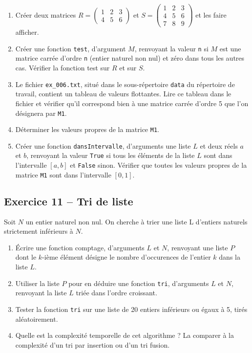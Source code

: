 \documentclass[10pt,fleqn]{article} %
\begin{document}
\begin{multicols}{2}
\begin{enumerate}
\item Créer deux matrices $R=\begin{pmatrix} 1 & 2 & 3 \\ 4 & 5 & 6  \end{pmatrix}$ et 
$S =\begin{pmatrix} 1 & 2 & 3 \\ 4 & 5 & 6\\ 7 & 8 & 9  \end{pmatrix}$ et les faire afficher.
\item Créer une fonction \texttt{test}, d’argument $M$, renvoyant la valeur \texttt{n} si $M$ est une matrice carrée d’ordre \texttt{n} (entier naturel non nul) et zéro dans tous les autres cas.
Vérifier la fonction test sur $R$ et sur $S$.
\item Le fichier \texttt{ex\_006.txt}, situé dans le sous-répertoire \texttt{data} du répertoire de travail, contient un tableau de valeurs flottantes. Lire ce tableau dans le fichier et vérifier qu’il correspond bien à une matrice carrée d’ordre 5 que l’on désignera par \texttt{M1}. 
\item Déterminer les valeurs propres de la matrice \texttt{M1}.
\item Créer une fonction \texttt{dansIntervalle}, d’arguments une liste $L$ et deux réels $a$ et $b$, renvoyant la valeur \texttt{True} si tous les éléments de la liste $L$ sont dans l’intervalle $[a, b]$ et \texttt{False} sinon. Vérifier que toutes les valeurs propres de la matrice \texttt{M1} sont dans l’intervalle $[0, 1]$.
\end{enumerate}


\subsection*{Exercice 11 -- Tri de liste}
Soit $N$ un entier naturel non nul. On cherche à trier une liste L d’entiers naturels strictement inférieurs à $N$.
\begin{enumerate}
\item Écrire une fonction comptage, d’arguments $L$ et $N$, renvoyant une liste $P$ dont le $k$-ième élément désigne le nombre d’occurences de l’entier $k$ dans la liste $L$.
\item Utiliser la liste $P$ pour en déduire une fonction \texttt{tri}, d’arguments $L$ et $N$, renvoyant la liste $L$ triée dans l’ordre croissant.
\item Tester la fonction \texttt{tri} sur une liste de 20 entiers inférieurs ou égaux à 5, tirés aléatoirement.
\item Quelle est la complexité temporelle de cet algorithme ? La comparer à la complexité d’un tri par insertion ou d’un tri fusion.
\end{enumerate}


\end{multicols}
\end{document}
